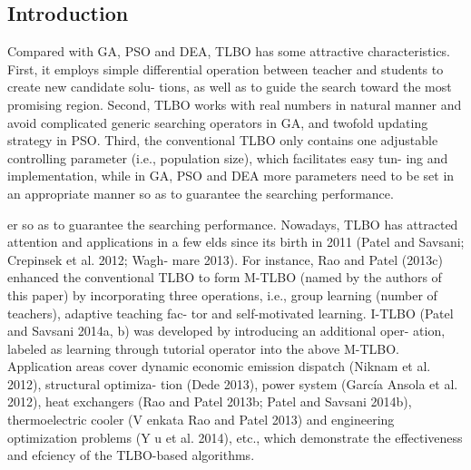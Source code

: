 \documentclass[
10pt, %
a4paper, %
onecolumn, %
portrait %
]{article}
\begin{document}
\begin{CJK*}{UTF8}{gbsn}
\pagestyle{myheadings} %
\markright{\doctitle} %


\thispagestyle{plain} %

\printtitle %


\section*{Introduction} %

Compared with GA, PSO and DEA, TLBO has some attractive
 characteristics. First, it employs simple differential operation
 between teacher and students to create new candidate solu-
 tions, as well as to guide the search toward the most promising
 region. Second, TLBO works with real numbers in natural
 manner and avoid complicated generic searching operators
 in GA, and twofold updating strategy in PSO. Third, the
 conventional TLBO only contains one adjustable controlling
 parameter (i.e., population size), which facilitates easy tun-
 ing and implementation, while in GA, PSO and DEA more
 parameters need to be set in an appropriate manner so as to
 guarantee the searching performance.


er so as to
 guarantee the searching performance. Nowadays, TLBO has
 attracted attention and applications in a few elds since its
 birth in 2011 (Patel and Savsani; Crepinsek et al. 2012; Wagh-
 mare 2013). For instance, Rao and Patel (2013c) enhanced
 the conventional TLBO to form M-TLBO (named by the
 authors of this paper) by incorporating three operations, i.e.,
 group learning (number of teachers), adaptive teaching fac-
 tor and self-motivated learning. I-TLBO (Patel and Savsani
 2014a, b) was developed by introducing an additional oper-
 ation, labeled as learning through tutorial operator into the
 above M-TLBO. Application areas cover dynamic economic
 emission dispatch (Niknam et al. 2012), structural optimiza-
 tion (Dede 2013), power system (García Ansola et al. 2012),
 heat exchangers (Rao and Patel 2013b; Patel and Savsani
 2014b), thermoelectric cooler (V enkata Rao and Patel 2013)
 and engineering optimization problems (Y u et al. 2014), etc.,
 which demonstrate the effectiveness and efciency of the
 TLBO-based algorithms.


\end{CJK*}
\end{document}
